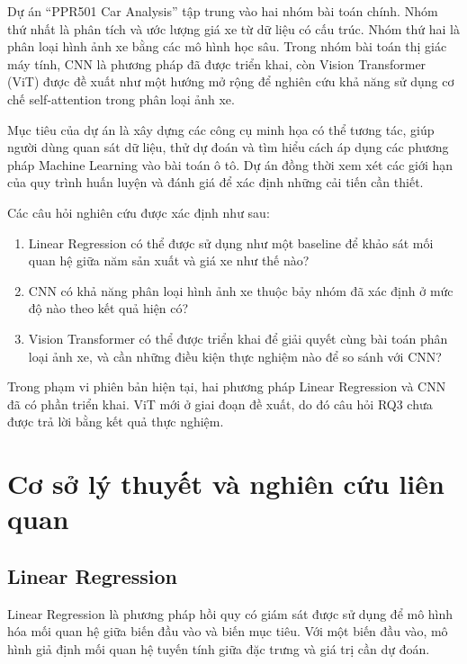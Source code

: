 \documentclass[runningheads]{llncs}
\begin{document}
Dự án ``PPR501 Car Analysis'' tập trung vào hai nhóm bài
toán chính. Nhóm thứ nhất là phân tích và ước lượng giá xe
từ dữ liệu có cấu trúc. Nhóm thứ hai là phân loại hình ảnh
xe bằng các mô hình học sâu. Trong nhóm bài toán thị giác
máy tính, CNN là phương pháp đã được triển khai, còn Vision
Transformer (ViT) được đề xuất như một hướng mở rộng để
nghiên cứu khả năng sử dụng cơ chế self-attention trong
phân loại ảnh xe.

Mục tiêu của dự án là xây dựng các công cụ minh họa có thể
tương tác, giúp người dùng quan sát dữ liệu, thử dự đoán
và tìm hiểu cách áp dụng các phương pháp Machine Learning
vào bài toán ô tô. Dự án đồng thời xem xét các giới hạn của
quy trình huấn luyện và đánh giá để xác định những cải tiến
cần thiết.

Các câu hỏi nghiên cứu được xác định như sau:

\begin{enumerate}[label=\textbf{RQ\arabic*.}]
    \item Linear Regression có thể được sử dụng như một
          baseline để khảo sát mối quan hệ giữa năm sản xuất và
          giá xe như thế nào?
    \item CNN có khả năng phân loại hình ảnh xe thuộc bảy
          nhóm đã xác định ở mức độ nào theo kết quả hiện có?
    \item Vision Transformer có thể được triển khai để giải
          quyết cùng bài toán phân loại ảnh xe, và cần những
          điều kiện thực nghiệm nào để so sánh với CNN?
\end{enumerate}

Trong phạm vi phiên bản hiện tại, hai phương pháp Linear
Regression và CNN đã có phần triển khai. ViT mới ở giai
đoạn đề xuất, do đó câu hỏi RQ3 chưa được trả lời bằng
kết quả thực nghiệm.

\section{Cơ sở lý thuyết và nghiên cứu liên quan}

\subsection{Linear Regression}

Linear Regression là phương pháp hồi quy có giám sát được
sử dụng để mô hình hóa mối quan hệ giữa biến đầu vào và
biến mục tiêu. Với một biến đầu vào, mô hình giả định mối
quan hệ tuyến tính giữa đặc trưng và giá trị cần dự đoán.
\end{document}
